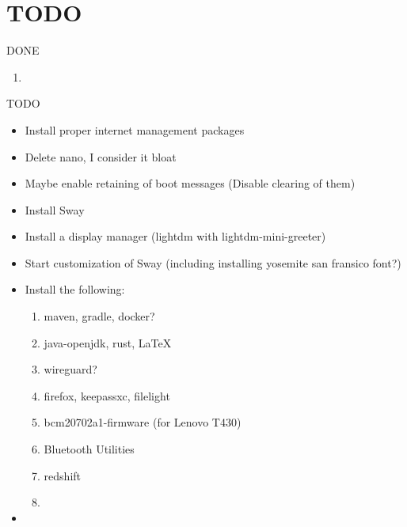 
\section{TODO}
DONE
\begin{enumerate}
    \item 
\end{enumerate}

TODO
\begin{itemize}
    \item Install proper internet management packages
    \item Delete nano, I consider it bloat
    \item Maybe enable retaining of boot messages (Disable clearing of them)
    \item Install Sway
    \item Install a display manager (lightdm with lightdm-mini-greeter)
    \item Start customization of Sway (including installing yosemite san fransico font?)
    \item Install the following:
    \begin{enumerate}
        \item maven, gradle, docker?
        \item java-openjdk, rust, \LaTeX
        \item wireguard?
        \item firefox, keepassxc, filelight
        \item bcm20702a1-firmware (for Lenovo T430)
        \item Bluetooth Utilities
        \item redshift
        \item 
    \end{enumerate}
    \item 
\end{itemize}
